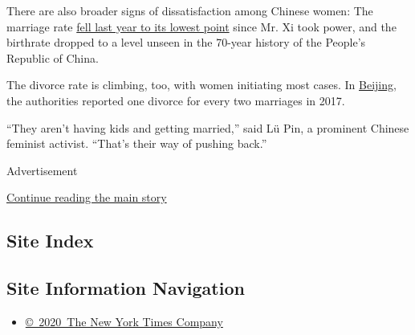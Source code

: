 There are also broader signs of dissatisfaction among Chinese women: The
marriage rate
\href{http://www.xinhuanet.com/politics/2019-04/02/c_1124313756.htm}{fell
last year to its lowest point} since Mr. Xi took power, and the
birthrate dropped to a level unseen in the 70-year history of the
People's Republic of China.

The divorce rate is climbing, too, with women initiating most cases. In
\href{http://mzj.beijing.gov.cn/news/root/tjnb/2019-04/129817.shtml}{Beijing},
the authorities reported one divorce for every two marriages in 2017.

``They aren't having kids and getting married,'' said Lü Pin, a
prominent Chinese feminist activist. ``That's their way of pushing
back.''

Advertisement

\protect\hyperlink{after-bottom}{Continue reading the main story}

\hypertarget{site-index}{%
\subsection{Site Index}\label{site-index}}

\hypertarget{site-information-navigation}{%
\subsection{Site Information
Navigation}\label{site-information-navigation}}

\begin{itemize}
\tightlist
\item
  \href{https://help.nytimes3xbfgragh.onion/hc/en-us/articles/115014792127-Copyright-notice}{©~2020~The
  New York Times Company}
\end{itemize}

